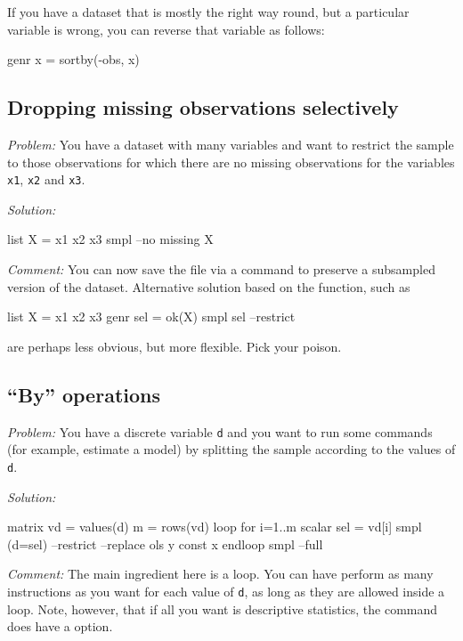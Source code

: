 If you have a dataset that is mostly the right way round, but a
particular variable is wrong, you can reverse that variable as
follows:
\begin{code}
genr x = sortby(-obs, x)
\end{code}


\subsection{Dropping missing observations selectively}

\emph{Problem:} You have a dataset with many variables and want to
restrict the sample to those observations for which there are no
missing observations for the variables \texttt{x1}, \texttt{x2} and
\texttt{x3}.

\begin{samepage}
\emph{Solution:}
\begin{code}
list X = x1 x2 x3
smpl --no missing X
\end{code}
\end{samepage}

\emph{Comment:} You can now save the file via a  command
to preserve a subsampled version of the dataset. Alternative solution
based on the  function, such as
\begin{code}
list X = x1 x2 x3
genr sel = ok(X)
smpl sel --restrict
\end{code}
are perhaps less obvious, but more flexible. Pick your poison.

\subsection{``By'' operations}

\emph{Problem:} You have a discrete variable \texttt{d} and you want
to run some commands (for example, estimate a model) by splitting the
sample according to the values of \texttt{d}.

\emph{Solution:}
\begin{code}
matrix vd = values(d)
m = rows(vd)
loop for i=1..m
  scalar sel = vd[i]
  smpl (d=sel) --restrict --replace
  ols y const x
endloop
smpl --full
\end{code}

\emph{Comment:} The main ingredient here is a loop.  You can have
 perform as many instructions as you want for each value of
\texttt{d}, as long as they are allowed inside a loop. Note, however,
that if all you want is descriptive statistics, the 
command does have a  option.

